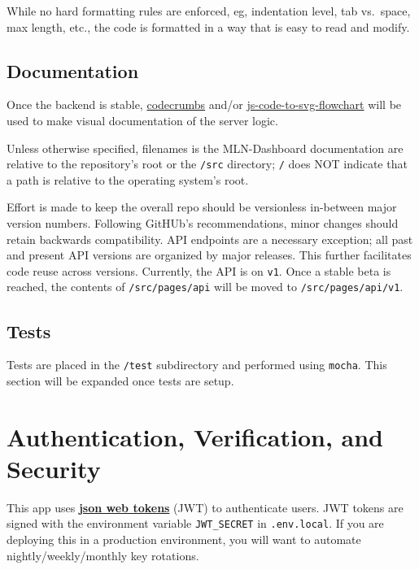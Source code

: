 While no hard formatting rules are enforced, eg, indentation level, tab
vs.~space, max length, etc., the code is formatted in a way that is easy
to read and modify.

\hypertarget{documentation}{%
\subsection{Documentation}\label{documentation}}

Once the backend is stable, \href{https://codecrumbs.io/}{codecrumbs}
and/or
\href{https://bogdan-lyashenko.github.io/js-code-to-svg-flowchart/docs/live-editor}{js-code-to-svg-flowchart}
will be used to make visual documentation of the server logic.

Unless otherwise specified, filenames is the MLN-Dashboard documentation
are relative to the repository's root or the \texttt{/src} directory;
\texttt{/} does NOT indicate that a path is relative to the operating
system's root.

Effort is made to keep the overall repo should be versionless in-between
major version numbers. Following GitHUb's recommendations, minor changes
should retain backwards compatibility. API endpoints are a necessary
exception; all past and present API versions are organized by major
releases. This further facilitates code reuse across versions.
Currently, the API is on \texttt{v1}. Once a stable beta is reached, the
contents of \texttt{/src/pages/api} will be moved to
\texttt{/src/pages/api/v1}.

\hypertarget{tests}{%
\subsection{Tests}\label{tests}}

Tests are placed in the \texttt{/test} subdirectory and performed using
\texttt{mocha}. This section will be expanded once tests are setup.

\hypertarget{authentication-verification-and-security}{%
\section{Authentication, Verification, and
Security}\label{authentication-verification-and-security}}

This app uses \textbf{\href{https://jwt.io/}{json web tokens}} (JWT) to
authenticate users. JWT tokens are signed with the environment variable
\texttt{JWT\_SECRET} in \texttt{.env.local}. If you are deploying this
in a production environment, you will want to automate
nightly/weekly/monthly key rotations.

